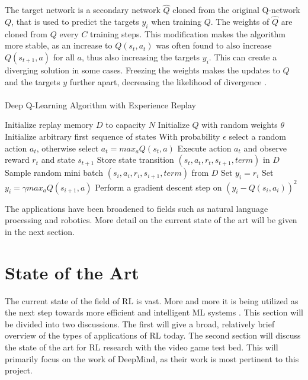 The target network is a secondary network $\hat{Q}$ cloned from the original Q-network $Q$, that is used to predict the targets $y_i$ when training $Q$. The weights of $\hat{Q}$ are cloned from $Q$ every $C$ training steps. This modification makes the algorithm more stable, as an increase to $Q(s_t, a_t)$ was often found to also increase $Q(s_{t+1}, a)$ for all $a$, thus also increasing the targets $y_i$. This can create a diverging solution in some cases. Freezing the weights makes the updates to $Q$ and the targets $y$ further apart, decreasing the likelihood of divergence \cite{human}. \paragraph{}

\begin{algorithm}
    \caption{Deep Q-Learning Algorithm with Experience Replay}\label{alg:QN}
    \begin{algorithmic}[1]
        \State Initialize replay memory $D$ to capacity $N$
        \State Initialize $Q$ with random weights $\theta$
        \State Initialize arbitrary first sequence of states
        \State With probability $\epsilon$ select a random action $a_t$, otherwise select $a_t = max_a Q(s_t, a)$
        \State Execute action $a_t$ and observe reward $r_t$ and state $s_{t+1}$
        \State Store state transition $(s_t, a_t, r_t, s_{t+1}, term)$ in $D$
        \State Sample random mini batch $(s_i, a_i, r_i, s_{i + 1}, term)$ from $D$
        \State Set $y_i = r_i$
        \Else
        \State Set $y_i = \gamma max_a Q(s_{i+1}, a)$
        \EndIf
        \EndFor
        \State Perform a gradient descent step on $(y_i - Q(s_i, a_i))^2$
        \EndFor
    \end{algorithmic}
\end{algorithm}

The applications have been broadened to fields such as natural language processing and robotics. More detail on the current state of the art will be given in the next section.

\section{State of the Art}
The current state of the field of RL is vast. More and more it is being utilized as the next step towards more efficient and intelligent ML systems \cite{survey-drl}. This section will be divided into two discussions. The first will give a broad, relatively brief overview of the types of applications of RL today. The second section will discuss the state of the art for RL research with the video game test bed. This will primarily focus on the work of DeepMind, as their work is most pertinent to this project. 
